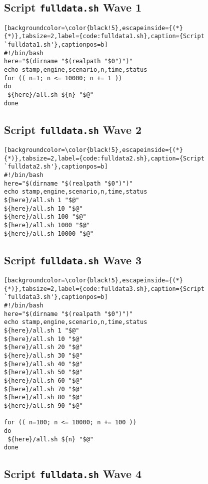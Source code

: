 \subsection*{Script \texttt{fulldata.sh} Wave 1}
\label{appendix:fulldata1.sh}

\begin{lstlisting}[backgroundcolor=\color{black!5},escapeinside={(*}{*)},tabsize=2,label={code:fulldata1.sh},caption={Script `fulldata1.sh'},captionpos=b]
#!/bin/bash
here="$(dirname "$(realpath "$0")")"
echo stamp,engine,scenario,n,time,status
for (( n=1; n <= 10000; n += 1 ))
do
 ${here}/all.sh ${n} "$@"
done
\end{lstlisting}

\subsection*{Script \texttt{fulldata.sh} Wave 2}
\label{appendix:fulldata2.sh}

\begin{lstlisting}[backgroundcolor=\color{black!5},escapeinside={(*}{*)},tabsize=2,label={code:fulldata2.sh},caption={Script `fulldata2.sh'},captionpos=b]
#!/bin/bash
here="$(dirname "$(realpath "$0")")"
echo stamp,engine,scenario,n,time,status
${here}/all.sh 1 "$@"
${here}/all.sh 10 "$@"
${here}/all.sh 100 "$@"
${here}/all.sh 1000 "$@"
${here}/all.sh 10000 "$@"
\end{lstlisting}

\subsection*{Script \texttt{fulldata.sh} Wave 3}
\label{appendix:fulldata3.sh}

\begin{lstlisting}[backgroundcolor=\color{black!5},escapeinside={(*}{*)},tabsize=2,label={code:fulldata3.sh},caption={Script `fulldata3.sh'},captionpos=b]
#!/bin/bash
here="$(dirname "$(realpath "$0")")"
echo stamp,engine,scenario,n,time,status
${here}/all.sh 1 "$@"
${here}/all.sh 10 "$@"
${here}/all.sh 20 "$@"
${here}/all.sh 30 "$@"
${here}/all.sh 40 "$@"
${here}/all.sh 50 "$@"
${here}/all.sh 60 "$@"
${here}/all.sh 70 "$@"
${here}/all.sh 80 "$@"
${here}/all.sh 90 "$@"

for (( n=100; n <= 10000; n += 100 ))
do
 ${here}/all.sh ${n} "$@"
done
\end{lstlisting}

\subsection*{Script \texttt{fulldata.sh} Wave 4}
\label{appendix:fulldata4.sh}

